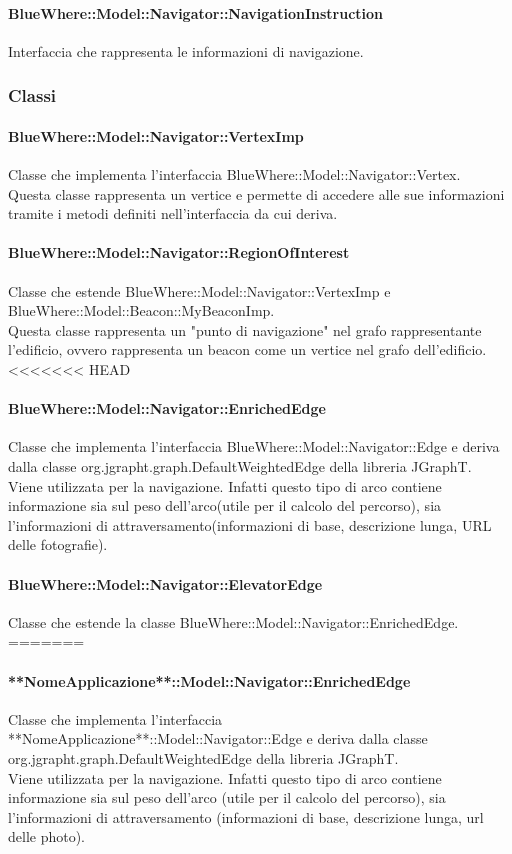 \documentclass[../SpecificaTecnica.tex]{subfiles}
\begin{document}
				\paragraph{BlueWhere::Model::Navigator::NavigationInstruction}
					Interfaccia che rappresenta le informazioni di navigazione. \\
			\subsubsection{Classi}
				\paragraph{BlueWhere::Model::Navigator::VertexImp}
					Classe che implementa l'interfaccia BlueWhere::Model::Navigator::Vertex. \\
					Questa classe rappresenta un vertice e permette di accedere alle sue informazioni tramite i metodi definiti nell'interfaccia da cui deriva.
				\paragraph{BlueWhere::Model::Navigator::RegionOfInterest}
					Classe che estende BlueWhere::Model::Navigator::VertexImp e BlueWhere::Model::Beacon::MyBeaconImp. \\
					Questa classe rappresenta un "punto di navigazione" nel grafo rappresentante l'edificio, ovvero rappresenta un beacon come un vertice nel grafo dell'edificio.
<<<<<<< HEAD
				\paragraph{BlueWhere::Model::Navigator::EnrichedEdge}
					Classe che implementa l'interfaccia BlueWhere::Model::Navigator::Edge e deriva dalla classe org.jgrapht.graph.DefaultWeightedEdge della libreria JGraphT. \\
					Viene utilizzata per la navigazione. Infatti questo tipo di arco contiene informazione sia sul peso dell'arco(utile per il calcolo del percorso), sia l'informazioni di attraversamento(informazioni di base, descrizione lunga, URL delle fotografie).
				\paragraph{BlueWhere::Model::Navigator::ElevatorEdge}
					Classe che estende la classe BlueWhere::Model::Navigator::EnrichedEdge. \\
=======
				\paragraph{**NomeApplicazione**::Model::Navigator::EnrichedEdge}
					Classe che implementa l'interfaccia **NomeApplicazione**::Model::Navigator::Edge e deriva dalla classe org.jgrapht.graph.DefaultWeightedEdge della libreria JGraphT. \\
					Viene utilizzata per la navigazione. Infatti questo tipo di arco contiene informazione sia sul peso dell'arco (utile per il calcolo del percorso), sia l'informazioni di attraversamento (informazioni di base, descrizione lunga, url delle photo).
\end{document}
